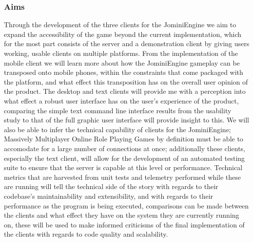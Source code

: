 \documentclass{article}
\begin{document}
	\subsubsection{Aims}
	Through the development of the three clients for the JominiEngine we aim to expand the accessibility of the game beyond the current implementation, which for the most part consists of the server and a demonstration client by giving users working, usable clients on multiple platforms. From the implementation of the mobile client we will learn more about how the JominiEngine gameplay can be transposed onto mobile phones, within the constraints that come packaged with the platform, and what effect this transposition has on the overall user opinion of the product. The desktop and text clients will provide me with a perception into what effect a robust user interface has on the user's experience of the product, comparing the simple text command line interface results from the usability study to that of the full graphic user interface will provide insight to this. We will also be able to infer the technical capability of clients for the JominiEngine; Massively Multiplayer Online Role Playing Games by definition must be able to accomodate for a large number of connections at once; additionally these clients, especially the text client, will allow for the development of an automated testing suite to ensure that the server is capable at this level or performance. Technical metrics that are harvested from unit tests and telemetry performed while these are running will tell the technical side of the story with regards to their codebase's maintainability and extensibility, and with regards to their performance as the program is being executed, comparisons can be made between the clients and what effect they have on the system they are currently running on, these will be used to make informed criticisms of the final implementation of the clients with regards to code quality and scalability.
\end{document}
